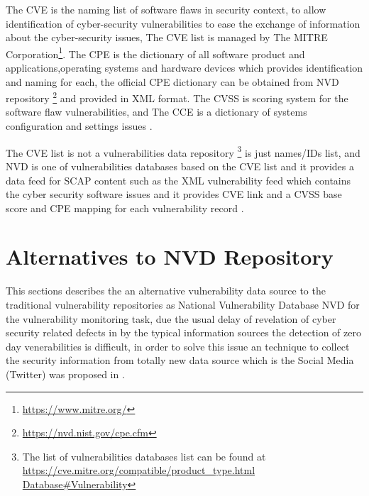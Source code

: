 \documentclass{llncs}
\begin{document}
 \par  
The CVE is the naming list of software flaws in security context, to allow identification of cyber-security vulnerabilities to ease the exchange of information about the cyber-security issues, The CVE list is managed by The MITRE Corporation\footnote{\url{https://www.mitre.org/}}. The CPE is the dictionary of all software product and applications,operating systems and hardware devices which provides identification and naming for each, the official CPE dictionary can be obtained from NVD repository \footnote{\url{https://nvd.nist.gov/cpe.cfm}} and provided in XML format. The CVSS is scoring system for the software flaw vulnerabilities, and The CCE is  a dictionary of systems configuration and settings issues \cite{scap_doc}.
\par
The CVE list is not a vulnerabilities data repository \footnote{The list of vulnerabilities databases list can be found at  \url{https://cve.mitre.org/compatible/product_type.html Database\#Vulnerability}} is just names/IDs list, 
and NVD is one of vulnerabilities databases based on the CVE list and it provides a data feed for SCAP content such as  the XML vulnerability feed which contains the cyber security software issues and it provides CVE link and  a CVSS base score and CPE mapping for each vulnerability record \cite{nvd}.    


\section{Alternatives to NVD Repository}

\par This sections describes the an alternative vulnerability data source to the traditional vulnerability repositories as National Vulnerability Database NVD for the vulnerability monitoring task, due the usual delay of revelation of cyber security related defects in by the typical information sources the detection of zero day venerabilities is difficult, in order to solve this issue an technique to collect the security information from totally new data source which is the Social Media (Twitter) was proposed in \cite{paper2}.
\par
\end{document}
